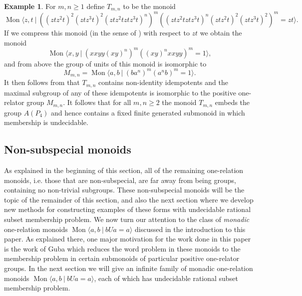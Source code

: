 \documentclass{amsart}
\newcommand{\Mpres}[2]{\operatorname{Mon}\bigl\langle #1\:|\:#2 \bigr\rangle}
\theoremstyle{plain}
\theoremstyle{definition}
\newtheorem{example}[theorem]{Example}
\begin{document}
\begin{example}\label{ex_compressSpecial}
For $m,n \geq 1$ define $T_{m,n}$ to be the monoid  
\[
\Mpres{z,t}{((ztz^2t)^2(ztz^3t)^2 (ztz^2tztz^3t)^n)^m((ztz^2tztz^3t)^n (ztz^2t)^2(ztz^3t)^2 )^m = zt}. 
\]
If we compress this monoid (in the sense of \cite{Lallement1974, Kobayashi2000}) with respect to $zt$ we obtain the monoid  
\[
\Mpres{x, y}{(xxyy (xy)^n)^m((xy)^n xxyy)^m = 1}, 
\]
and from above the group of units of this monoid is isomorphic to 
\[
M_{m,n} = \Mpres{a,b}{(b a^n)^m(a^n b)^m = 1}. 
\]
It then follows from \cite{Lallement1974} that $T_{m,n}$ contains non-identity idempotents and the maximal subgroup of any of these idempotents is isomorphic to the positive one-relator group $M_{m,n}$. It follows that for all $m, n \geq 2$ 
the monoid $T_{m,n}$ embeds the group $A(P_4)$ and hence contains a fixed finite generated submonoid in which membership is undecidable.   
\end{example}



\subsection{Non-subspecial monoids} 

As explained in the beginning of this section, all of the remaining one-relation monoids, i.e. those that are non-subspecial, are far away from being groups, containing no non-trivial subgroups. These non-subspecial monoids will be the topic of the remainder of this section, and also the next section where we develop new methods for constructing examples of these forms with undecidable rational subset membership problem. We now turn our attention to the class of \textit{monadic} one-relation monoids $\Mpres{a,b}{bUa=a}$ discussed in the introduction to this paper. As explained there, one major motivation for the work done in this paper is the work of Guba \cite{Guba1997} which reduces the word problem in these monoids to the membership problem in certain submonoids of particular positive one-relator groups. In the next section we will give an infinite family of monadic one-relation monoids $\Mpres{a,b}{bUa=a}$, each of which has undecidable rational subset membership problem. 
\end{document}
